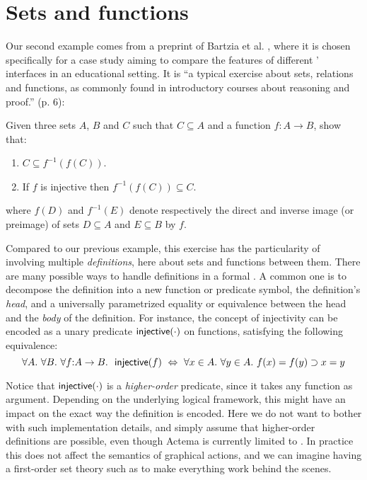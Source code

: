 \section{Sets and functions}

Our second example comes from a preprint of Bartzia et al.
\cite{bartzia:hal-04087080}, where it is chosen specifically for a case study
aiming to compare the features of different ' interfaces in an
educational setting. It is ``a typical exercise about sets, relations and
functions, as commonly found in introductory courses about reasoning and
proof.'' (p. 6):

\begin{exercise}
  Given three sets $A$, $B$ and $C$ such that $C \subseteq A$ and a function $f
  : A \to B$, show that:
  \begin{enumerate}
    \item $C \subseteq f^{-1}(f(C))$.
    \item If $f$ is injective then $f^{-1}(f(C)) \subseteq C$.
  \end{enumerate}
  where $f(D)$ and $f^{-1}(E)$ denote respectively the direct and inverse image
  (or preimage) of sets $D \subseteq A$ and $E \subseteq B$ by $f$.
\end{exercise}

Compared to our previous example, this exercise has the particularity of
involving multiple \emph{definitions}, here about sets and functions between
them. There are many possible ways to handle definitions in a formal . A common one is to decompose the definition into a new function or
predicate symbol, the definition's \emph{head}, and a universally parametrized
equality or equivalence between the head and the \emph{body} of the definition.
For instance, the concept of injectivity can be encoded as a unary predicate
$\mbox{\textsf{injective}}(\cdot)$ on functions, satisfying the following equivalence:
$$\forall A.\ \forall B.\ \forall f{:}A \to B.~\ \injective(f) ~\lequiv~ \forall x
\in A.\ \forall y \in A.\ f(x) = f(y) \limp x = y$$

Notice that $\mbox{\textsf{injective}}(\cdot)$ is a \emph{higher-order} predicate, since it
takes any function as argument. Depending on the underlying logical framework,
this might have an impact on the exact way the definition is encoded. Here we do
not want to bother with such implementation details, and simply assume that
higher-order definitions are possible, even though Actema is currently limited
to . In practice this does not affect the semantics of
graphical actions, and we can imagine having a first-order set theory such as
 to make everything work behind the scenes.

